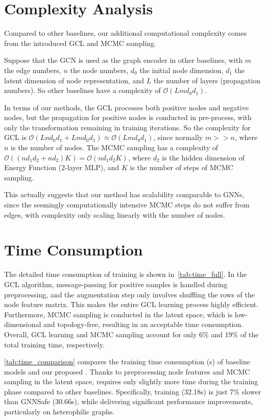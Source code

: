 


\section{Complexity Analysis}
Compared to other baselines, our additional computational complexity comes from the introduced GCL and MCMC sampling. 

Suppose that the GCN is used as the graph encoder in other baselines, with $m$ the edge numbers, $n$ the node numbers, $d_0$ the initial node dimension, $d_1$ the latent dimension of node representation, and $L$ the number of layers (propagation numbers). 
So other baselines have a complexity of $\mathcal{O}(L m d_0 d_1)$. 

In terms of our methods, the GCL processes both positive nodes and negative nodes, but the propagation for positive nodes is conducted in pre-process, with only the transformation remaining in training iterations. So the complexity for GCL is $\mathcal{O}(L n d_0 d_1 + L m d_0 d_1) \approx \mathcal{O}(L m d_0 d_1)$, since normally $m >> n$, where $n$ is the number of nodes. 
The MCMC sampling has a complexity of $\mathcal{O}((nd_1d_2+nd_2)K)=\mathcal{O}(nd_1d_2K)$, where $d_2$ is the hidden dimension of Energy Function ($2$-layer MLP), and $K$ is the number of steps of MCMC sampling. 

This actually suggests that our method has scalability comparable to GNNs, since the seemingly computationally intensive MCMC steps do not suffer from edges, with complexity only scaling linearly with the number of nodes.


\section{Time Consumption}
\label{sec:time_full}
The detailed time consumption of \shortname training is shown in~\cref{tab:time_full}. 
In the GCL algorithm, message-passing for positive samples is handled during preprocessing, and the augmentation step only involves shuffling the rows of the node feature matrix. This makes the entire GCL learning process highly efficient. 
Furthermore, MCMC sampling is conducted in the latent space, which is low-dimensional and topology-free, resulting in an acceptable time consumption. 
Overall, GCL learning and MCMC sampling account for only 6\% and 19\% of the total training time, respectively. 

\cref{tab:time_comparison} compares the training time consumption (s) of baseline models and our proposed \shortname.
Thanks to preprocessing node features and MCMC sampling in the latent space, \shortname requires only slightly more time during the training phase compared to other baselines. Specifically, training \shortname (32.18s) is just 7\% slower than GNNSafe (30.66s), while delivering significant performance improvements, particularly on heterophilic graphs.

